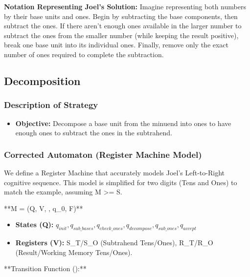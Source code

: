 \documentclass[11pt]{article}
\begin{document}
      \noindent \textbf{Notation Representing Joel's Solution:}
      \noindent Imagine representing both numbers by their base units and ones. Begin by subtracting the base components, then subtract the ones. If there aren't enough ones available in the larger number to subtract the ones from the smaller number (while keeping the result positive), break one base unit into its individual ones. Finally, remove only the exact number of ones required to complete the subtraction.


\subsection*{Decomposition}

\subsubsection*{Description of Strategy}
\begin{itemize}
    \item \textbf{Objective:} Decompose a base unit from the minuend into ones to have enough ones to subtract the ones in the subtrahend.
\end{itemize}

\subsubsection*{Corrected Automaton (Register Machine Model)}

We define a Register Machine that accurately models Joel's Left-to-Right cognitive sequence. This model is simplified for two digits (Tens and Ones) to match the example, assuming M >= S.

**M = (Q, V, \delta, q_0, F)**

\begin{itemize}
    \item \textbf{States (Q):} {$q_{init}, q_{sub\_bases}, q_{check\_ones}, q_{decompose}, q_{sub\_ones}, q_{accept}$}
    \item \textbf{Registers (V):} S\_T/S\_O (Subtrahend Tens/Ones), R\_T/R\_O (Result/Working Memory Tens/Ones).
\end{itemize}

**Transition Function (\delta):**
\end{document}
